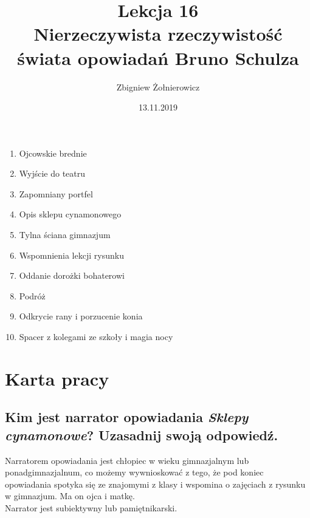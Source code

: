 \documentclass[a4paper]{article}
\begin{document}
\title{{\huge Lekcja 16} \\
{\large Nierzeczywista rzeczywistość świata opowiadań Bruno Schulza}}
\author{Zbigniew Żołnierowicz}
\date{13.11.2019}
\maketitle
\begin{enumerate}
    \item Ojcowskie brednie
    \item Wyjście do teatru
    \item Zapomniany portfel
    \item Opis sklepu cynamonowego
    \item Tylna ściana gimnazjum
    \item Wspomnienia lekcji rysunku
    \item Oddanie dorożki bohaterowi
    \item Podróż
    \item Odkrycie rany i porzucenie konia
    \item Spacer z kolegami ze szkoły i magia nocy
\end{enumerate}
\section{Karta pracy}
\subsection{Kim jest narrator opowiadania \emph{Sklepy cynamonowe}? Uzasadnij swoją odpowiedź.}
Narratorem opowiadania jest chłopiec w wieku gimnazjalnym lub ponadgimnazjalnum, co możemy wywnioskować z tego,
że pod koniec opowiadania spotyka się ze znajomymi z klasy i wspomina o zajęciach z rysunku w gimnazjum. Ma on ojca i matkę.
\\ Narrator jest subiektywny lub pamiętnikarski.
\pagebreak
\end{document}
